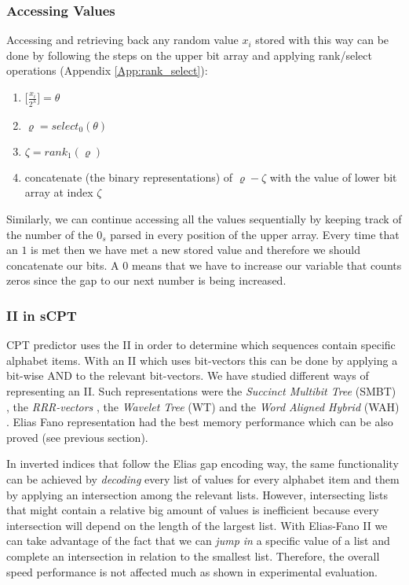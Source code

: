\subsubsection*{Accessing Values}
\par Accessing and retrieving back any random value \(x_i\) stored with this way can be done  by following the steps on the upper bit array and applying rank/select operations (Appendix \ref{App:rank_select}):
\begin{enumerate}
	\item \(\lbrack \frac{x_i}{2^{\lambda}} \rbrack = \theta \)
	\item \(\varrho = select_0(\theta)\)
	\item \(\zeta = rank_1(\varrho)\)
	\item concatenate (the binary representations) of \(\varrho - \zeta\) with the value of lower bit array at index \(\zeta\)
\end{enumerate}
Similarly, we can continue accessing all the values sequentially by keeping track of the number of the $0_s$ parsed in every position of the upper array. Every time that an $1$ is met then we have met a new stored value and therefore we should concatenate our bits. A $0$ means that we have to increase our variable that counts zeros since the gap to our next number is being increased.
\subsubsection*{II in sCPT}
CPT predictor uses the II in order to determine which sequences contain specific alphabet items. With an II which uses bit-vectors this can be done by applying a bit-wise AND to the relevant bit-vectors. We have studied different ways of representing an II. Such representations were the \emph{Succinct Multibit Tree} (SMBT) \cite{tabei_2012}, the \emph{RRR-vectors} \cite{Raman}, the \emph{Wavelet Tree} (WT) \cite{tabei_tsuda_2011} and the \emph{Word Aligned Hybrid} (WAH) \cite{wu_optimizing_2006}. Elias Fano representation had the best memory performance which can be also proved (see previous section).
\par In inverted indices that follow the Elias gap encoding way, the same functionality can be achieved by \emph{decoding} every list of values for every alphabet item and them by applying an intersection among the relevant lists. However, intersecting lists that might contain a relative big amount of values is inefficient because every intersection will depend on the length of the largest list. With Elias-Fano II we can take advantage of the fact that we can \emph{jump in} a specific value of a list and complete an intersection in relation to the smallest list. Therefore, the overall speed performance is not affected much as shown in experimental evaluation.

